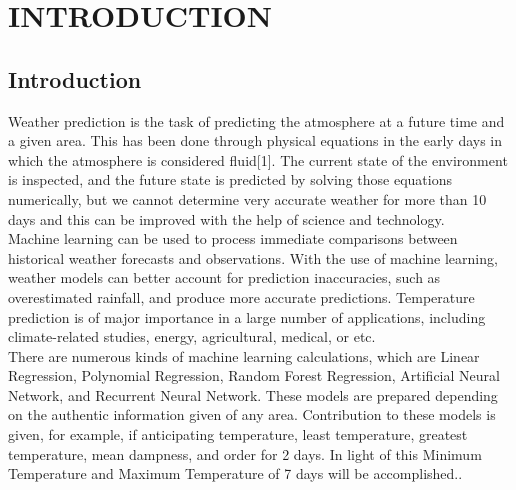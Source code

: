 \chapter{INTRODUCTION}
\label{chap:intro}
\section{Introduction}
Weather prediction is the task of predicting the atmosphere at a future time and a given area. This has been done through physical equations in the early days in which the atmosphere is considered fluid[1]. The current state of the environment is inspected, and the future state is predicted by solving those equations numerically, but we cannot determine very accurate weather for more than 10 days and this can be improved with the help of science and technology.
\\Machine learning can be used to process immediate comparisons between historical weather forecasts and observations. With the use of machine learning, weather models can better account for prediction inaccuracies, such as overestimated rainfall, and produce more accurate predictions. Temperature prediction is of major importance in a large number of applications, including climate-related studies, energy, agricultural, medical, or etc. 
\\There are numerous kinds of machine learning calculations, which are Linear Regression, Polynomial Regression, Random Forest Regression, Artificial Neural Network, and Recurrent Neural Network. These models are prepared depending on the authentic information given of any area. Contribution to these models is given, for example, if anticipating temperature, least temperature, greatest temperature, mean dampness, and order for 2 days. In light of this Minimum Temperature and Maximum Temperature of 7 days will be accomplished..
\\
\\
\\
\\
\\

